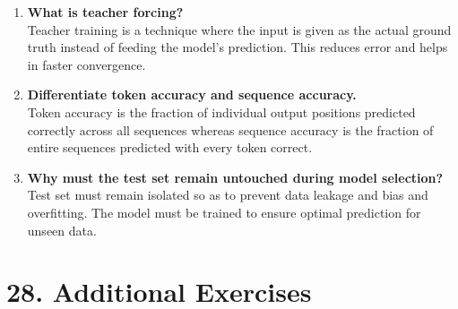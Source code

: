 \documentclass[10pt]{article}
\begin{document}
\begin{enumerate}
\item \textbf{What is teacher forcing?}\\
Teacher training is a technique where the input is given as the actual ground truth instead of feeding the model's prediction. This reduces error and helps in faster convergence.

\item \textbf{Differentiate token accuracy and sequence accuracy.}\\
Token accuracy is the fraction of individual output positions predicted
correctly across all sequences whereas sequence accuracy is the fraction of entire
sequences predicted with every token correct. 

\item \textbf{Why must the test set remain untouched during model selection?}\\
Test set must remain isolated so as to prevent data leakage and bias and overfitting. The model must be trained to ensure optimal prediction for unseen data.
\end{enumerate}

\section*{28. Additional Exercises}
\end{document}
